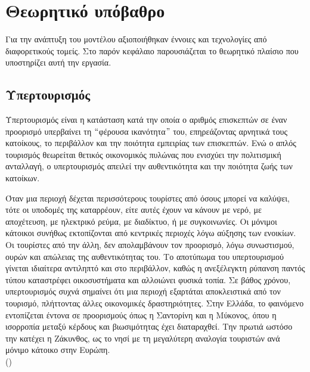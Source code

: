\chapter{Θεωρητικό υπόβαθρο}

Για την ανάπτυξη του μοντέλου αξιοποιήθηκαν έννοιες και
τεχνολογίες από διαφορετικούς τομείς. Στο παρόν κεφάλαιο
παρουσιάζεται το θεωρητικό πλαίσιο που υποστηρίζει αυτή την
εργασία.

\section{Υπερτουρισμός}

Υπερτουρισμός  είναι η κατάσταση κατά την οποία
ο αριθμός επισκεπτών σε έναν προορισμό υπερβαίνει τη $``$φέρουσα
ικανότητα$"$  του, επηρεάζοντας αρνητικά
τους κατοίκους, το περιβάλλον και την ποιότητα εμπειρίας των
επισκεπτών. Ενώ ο απλός τουρισμός θεωρείται θετικός οικονομικός
πυλώνας που ενισχύει την πολιτισμική ανταλλαγή, ο υπερτουρισμός
απειλεί την αυθεντικότητα και την ποιότητα ζωής των κατοίκων.

Όταν μια περιοχή δέχεται περισσότερους τουρίστες από όσους μπορεί
να καλύψει, τότε οι υποδομές της καταρρέουν, είτε αυτές έχουν να
κάνουν με νερό, με αποχέτευση, με ηλεκτρικό ρεύμα, με διαδίκτυο,
ή με συγκοινωνίες. Οι μόνιμοι κάτοικοι συνήθως εκτοπίζονται από
κεντρικές περιοχές λόγω αύξησης των ενοικίων. Οι τουρίστες από
την άλλη, δεν απολαμβάνουν τον προορισμό, λόγω συνωστισμού, ουρών
και απώλειας της αυθεντικότητας του. Το αποτύπωμα του υπερτουρισμού
γίνεται ιδιαίτερα αντιληπτό και στο περιβάλλον, καθώς η 
ανεξέλεγκτη ρύπανση παντός τύπου καταστρέφει οικοσυστήματα και
αλλοιώνει φυσικά τοπία. Σε βάθος χρόνου, υπερτουρισμός συχνά
σημαίνει ότι μια περιοχή εξαρτάται αποκλειστικά από τον τουρισμό,
πλήττοντας άλλες οικονομικές δραστηριότητες. Στην Ελλάδα, το
φαινόμενο εντοπίζεται έντονα σε προορισμούς όπως η Σαντορίνη και
η Μύκονος, όπου η ισορροπία μεταξύ κέρδους και βιωσιμότητας έχει
διαταραχθεί. Την πρωτιά ωστόσο την κατέχει η Ζάκυνθος, ως το νησί
με τη μεγαλύτερη αναλογία τουριστών ανά μόνιμο κάτοικο στην Ευρώπη.
\\()

\section{}

